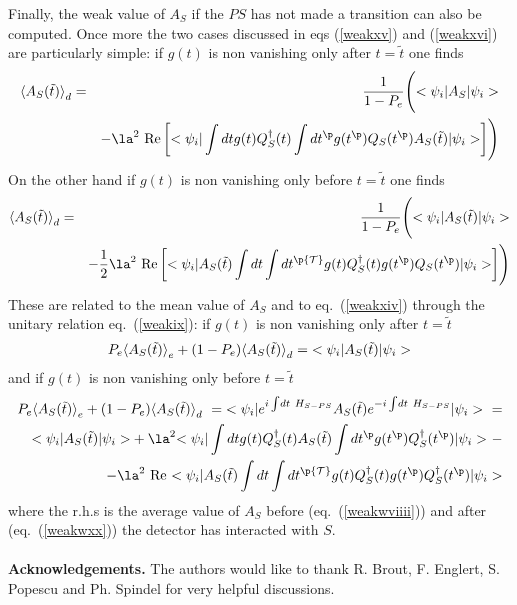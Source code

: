 Finally, the weak value of $A_S$ if the $PS$ has not made a
transition can also be computed.
Once more the two cases discussed in eqs (\ref{weakxv}) and (\ref{weakxvi})
are particularly simple: if $g(t)$ is non vanishing only after $t=\tilde t$ one
finds \begin{eqnarray}
\bk{A_{S}(\tilde t)}_{d} &=&{1 \over 1 - P_{e}  }\Biggl(
\bra{\psi_i}A_S\ket{\psi_i} \nonumber\\
& &-\la^2 \mbox{ Re}  \left[
\bi \int dt g(t) Q_S^\dagger (t)
 \int dt^\p g(t^\p) Q_S(t^\p)  A_S(\tilde t) \ki\right]\Biggr)
\label{weakxvii}
\end{eqnarray}
On the other hand if $g(t)$ is non vanishing only before $t=\tilde t$ one finds
\begin{eqnarray}
\bk{A_{S}(\tilde t)}_{d}  &=&{1 \over 1 - P_{e}  }\Biggl(
\bra{\psi_i}A_S(\tilde t)\ket{\psi_i} \nonumber\\
& & -{1 \over 2} \la^2 \mbox{ Re} \left[
\bi A_S(\tilde t) \int dt
 \int dt^\p {\cal T} g(t) Q_S^\dagger (t) g(t^\p) Q_S(t^\p)   \ki\right]
\Biggr)
\label{weakxviii} \end{eqnarray}
These are related to the mean value of $A_S$
and to eq.~(\ref{weakxiv}) through the unitary relation eq.~(\ref{weakix}):
if $g(t)$ is non vanishing only after $t=\tilde t$
\begin{eqnarray}
 P_{e}\mbox{$ \langle A_{S}(\tilde t) \rangle $}_{e}
+ (1 - P_{e} )
\mbox{$ \langle A_{S}(\tilde t) \rangle $}_{d} = \mbox{$ \mbox{$ < \psi_i \vert $} $} A_S(\tilde t) \mbox{$ \mbox{$ \vert \psi_i > $} $} \label{weakwviiii}
\end{eqnarray}
and if $g(t)$ is non vanishing only before $t=\tilde t$
\begin{eqnarray}
\lefteqn{ P_{e}\bk{A_{S}(\tilde t)}_{e}
+ (1 - P_{e} )\bk{A_{S}(\tilde t)}_{d} \ =
\bi e^{i\int \! dt \ H_{S-PS}}
A_S (\tilde t)
e^{-i\int \! dt \ H_{S-PS}}
\ki
\ =}
\nonumber\\
& &\bi A_S(\tilde t) \ki
  +\la^2
\bi \int dt g(t) Q_S^\dagger (t) A_S(\tilde t)
\int dt^\p g(t^\p) Q_S^\dagger (t^\p)\ki \ -\nonumber\\
& &  -\la^2 \mbox{ Re } \bi A_S(\tilde t) \int dt
\int dt^\p {\cal T} g(t) Q_S^\dagger (t) g(t^\p) Q_S^\dagger (t^\p)\ki
\label{weakwxx}
\end{eqnarray}
where the r.h.s is the average value of $A_S$ before
(eq.~(\ref{weakwviiii})) and after (eq.~(\ref{weakwxx})) the detector
has interacted with $S$.
\\
\\
{\bf Acknowledgements.}
\noindent The authors would like to thank R. Brout,
F. Englert, S. Popescu and Ph. Spindel for very helpful
discussions.





